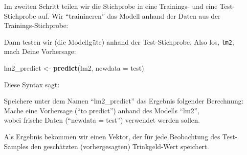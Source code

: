 \documentclass[12pt,ngerman,]{book}
\makeatletter
\newenvironment{Shaded}{\begin{snugshade}}{\end{snugshade}}
\newcommand{\KeywordTok}[1]{\textcolor[rgb]{0.13,0.29,0.53}{\textbf{{#1}}}}
\newcommand{\DataTypeTok}[1]{\textcolor[rgb]{0.13,0.29,0.53}{{#1}}}
\newcommand{\DecValTok}[1]{\textcolor[rgb]{0.00,0.00,0.81}{{#1}}}
\newcommand{\StringTok}[1]{\textcolor[rgb]{0.31,0.60,0.02}{{#1}}}
\newcommand{\CommentTok}[1]{\textcolor[rgb]{0.56,0.35,0.01}{\textit{{#1}}}}
\newcommand{\OtherTok}[1]{\textcolor[rgb]{0.56,0.35,0.01}{{#1}}}
\newcommand{\NormalTok}[1]{{#1}}
\newenvironment{kframe}{%
\medskip{}
\setlength{\fboxsep}{.8em}
 \def\at@end@of@kframe{}%
 \ifinner\ifhmode%
  \def\at@end@of@kframe{\end{minipage}}%
  \begin{minipage}{\columnwidth}%
 \fi\fi%
 \def\FrameCommand##1{\hskip\@totalleftmargin \hskip-\fboxsep
 \colorbox{shadecolor}{##1}\hskip-\fboxsep
     \hskip-\linewidth \hskip-\@totalleftmargin \hskip\columnwidth}%
 \MakeFramed {\advance\hsize-\width
   \@totalleftmargin\z@ \linewidth\hsize
   \@setminipage}}%
 {\par\unskip\endMakeFramed%
 \at@end@of@kframe}
\renewenvironment{Shaded}{\begin{kframe}}{\end{kframe}}
\let\BeginKnitrBlock\begin \let\EndKnitrBlock\end
\makeatother
\begin{document}
Im zweiten Schritt teilen wir die Stichprobe in eine Trainings- und eine
Test-Stichprobe auf. Wir ``trainineren'' das Modell anhand der Daten aus
der Trainings-Stichprobe:

\begin{Shaded}
\end{Shaded}

Dann testen wir (die Modellgüte) anhand der Test-Stichprobe. Also los,
\texttt{lm2}, mach Deine Vorhersage:

\begin{Shaded}
\begin{Highlighting}[]
\NormalTok{lm2_predict <-}\StringTok{ }\KeywordTok{predict}\NormalTok{(lm2, }\DataTypeTok{newdata =} \NormalTok{test)}
\end{Highlighting}
\end{Shaded}

Diese Syntax sagt:

\BeginKnitrBlock{rmdpseudocode}
Speichere unter dem Namen ``lm2\_predict'' das Ergebnis folgender
Berechnung:\\
Mache eine Vorhersage (``to predict'') anhand des Modells ``lm2'',\\
wobei frische Daten (``newdata = test'') verwendet werden sollen.
\EndKnitrBlock{rmdpseudocode}

Als Ergebnis bekommen wir einen Vektor, der für jede Beobachtung des
Test-Samples den geschätzten (vorhergesagten) Trinkgeld-Wert speichert.

\begin{Shaded}
\end{Shaded}
\end{document}
